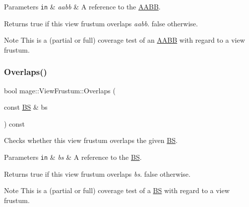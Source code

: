 \begin{DoxyParams}[1]{Parameters}
\mbox{\tt in}  & {\em aabb} & A reference to the \hyperlink{structmage_1_1_a_a_b_b}{A\+A\+BB}. \\
\hline
\end{DoxyParams}
\begin{DoxyReturn}{Returns}
{\ttfamily true} if this view frustum overlaps {\itshape aabb}. {\ttfamily false} otherwise. 
\end{DoxyReturn}
\begin{DoxyNote}{Note}
This is a (partial or full) coverage test of an \hyperlink{structmage_1_1_a_a_b_b}{A\+A\+BB} with regard to a view frustum. 
\end{DoxyNote}
\hypertarget{structmage_1_1_view_frustum_ad7b492eaad1a93e650a8477045d5c0cb}{}\label{structmage_1_1_view_frustum_ad7b492eaad1a93e650a8477045d5c0cb} 
\subsubsection{\texorpdfstring{Overlaps()}{Overlaps()}\hspace{0.1cm}{\footnotesize\ttfamily [2/2]}}
{\footnotesize\ttfamily bool mage\+::\+View\+Frustum\+::\+Overlaps (\begin{DoxyParamCaption}\item[{const \hyperlink{structmage_1_1_b_s}{BS} \&}]{bs }\end{DoxyParamCaption}) const\hspace{0.3cm}{\ttfamily [noexcept]}}

Checks whether this view frustum overlaps the given \hyperlink{structmage_1_1_b_s}{BS}.


\begin{DoxyParams}[1]{Parameters}
\mbox{\tt in}  & {\em bs} & A reference to the \hyperlink{structmage_1_1_b_s}{BS}. \\
\hline
\end{DoxyParams}
\begin{DoxyReturn}{Returns}
{\ttfamily true} if this view frustum overlaps {\itshape bs}. {\ttfamily false} otherwise. 
\end{DoxyReturn}
\begin{DoxyNote}{Note}
This is a (partial or full) coverage test of a \hyperlink{structmage_1_1_b_s}{BS} with regard to a view frustum. 
\end{DoxyNote}
\hypertarget{structmage_1_1_view_frustum_a2eef224e458509eada25ec91a53753c6}{}\label{structmage_1_1_view_frustum_a2eef224e458509eada25ec91a53753c6} 

